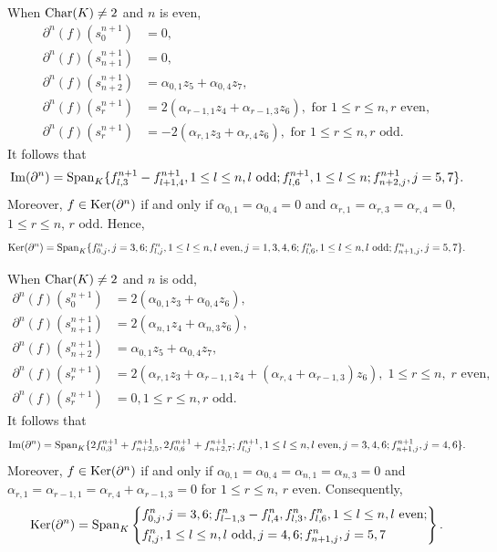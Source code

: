 \documentclass[10pt, reqno]{amsart}
\theoremstyle{definition}
\theoremstyle{remark}
\numberwithin{equation}{section}
\begin{document}
When \(\mathrm{Char}(K)\neq 2\) and \(n\) is even, 
\[\begin{aligned}
     \partial^n(f)(s_0^{n+1}) &= 0, \\
     \partial^n(f)(s_{n+1}^{n+1}) &= 0,\\
     \partial^n(f)(s_{n+2}^{n+1}) &=\alpha_{0,1} z_5+\alpha_{0,4}z_7,\\
    \partial^n(f)(s_r^{n+1}) &=2(\alpha_{r-1,1} z_4+\alpha_{r-1,3}z_6), \text{ for } 1 \le r \le n, r \text{ even},\\
     \partial^n(f)(s_r^{n+1}) &=-2(\alpha_{r,1} z_3+\alpha_{r,4}z_6), \text{ for } 1 \le r \le n, r \text{ odd}.
\end{aligned}\]
It follows that
\[\mathrm{Im}(\partial^n)= \mathrm{Span}_K \{f_{l,3}^{n+1}-f_{l+1,4}^{n+1}, 1\le l \le n, l \text{ odd}; f_{l,6}^{n+1}, 1 \le l \le n; f_{n+2,j}^{n+1}, j=5,7\}.\]
Moreover, \(f \in  \mathrm{Ker}(\partial^n)\) if and only if \(\alpha_{0,1}=\alpha_{0,4}=0\) and $\alpha_{r,1}=\alpha_{r,3}=\alpha_{r,4}=0$, $1\le r \le n$, $r \text{ odd}$. Hence,
\[\mathrm{Ker}(\partial^n)=\mathrm{Span}_K\{ f_{0,j}^n, j=3,6; f_{l,j}^n, 1\le l \le n, l \text{ even}, j=1,3,4,6; f_{l,6}^n, 1\le l \le n, l \text{ odd}; f_{n+1,j}^n, j=5,7\}.\]

When \(\mathrm{Char}(K)\neq 2\) and \(n\) is odd, 
\[\begin{aligned}
     \partial^n(f)(s_0^{n+1}) &=2(\alpha_{0,1}z_3+\alpha_{0,4}z_6), \\
     \partial^n(f)(s_{n+1}^{n+1}) &= 2(\alpha_{n,1}z_4+ \alpha_{n,3}z_6),\\
     \partial^n(f)(s_{n+2}^{n+1}) &= \alpha_{0,1} z_5+\alpha_{0,4}z_7,\\
     \partial^n(f)(s_r^{n+1}) &= 2(\alpha_{r,1}z_3+ \alpha_{r-1,1}z_4+(\alpha_{r,4}+\alpha_{r-1,3})z_6),\; 1 \le r \le n,\; r \text{ even},\\
     \partial^n(f)(s_r^{n+1}) &=0, 1 \le r \le n, r \text{ odd}.
\end{aligned}\]
It follows that
\[\mathrm{Im}(\partial^n)= \mathrm{Span}_K \{2f_{0,3}^{n+1}+f_{n+2,5}^{n+1}, 2f_{0,6}^{n+1}+f_{n+2,7}^{n+1}; f_{l,j}^{n+1}, 1\le l \le n, l \text{ even}, j=3,4,6; f_{n+1,j}^{n+1}, j=4,6\}.\]
Moreover, \(f \in  \mathrm{Ker}(\partial^n)\) if and only if \(\alpha_{0,1}=\alpha_{0,4}=\alpha_{n,1}=\alpha_{n,3}=0\) and $\alpha_{r,1}=\alpha_{r-1,1}=\alpha_{r,4}+\alpha_{r-1,3}=0$ for $1 \le r \le n$, $r \text{ even}$. Consequently,
\[\mathrm{Ker}(\partial^n)=\mathrm{Span}_K \left\{\begin{aligned}
   & f_{0,j}^n, j=3,6; f_{l-1,3}^n-f_{l,4}^n, f_{l,3}^n,  f_{l,6}^n, 1\le l \le n, l \text{ even};\\
   & f_{l,j}^n, 1\le l \le n, l \text{ odd}, j=4,6; f_{n+1,j}^n, j=5,7
\end{aligned}\right\}.\]
\end{document}
